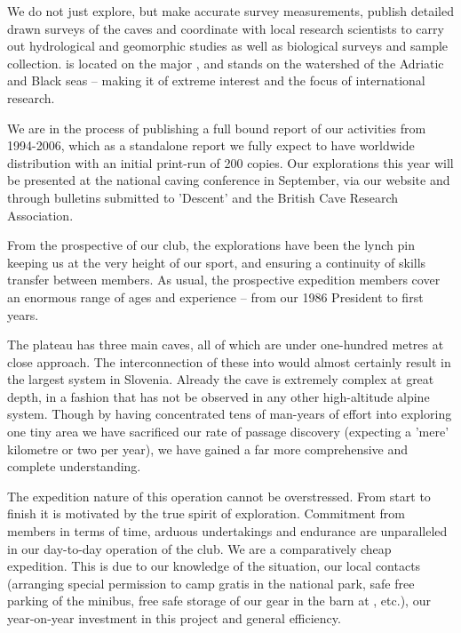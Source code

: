 We do not just explore, but make accurate survey measurements, publish detailed drawn surveys of the caves and coordinate with local research scientists to carry out hydrological and geomorphic studies as well as biological surveys and sample collection.  is located on the major , and stands on the watershed of the Adriatic and Black seas -- making it of extreme interest and the focus of international research.


We are in the process of publishing a full bound report of our activities from 1994-2006, which as a standalone report we fully expect to have worldwide distribution with an initial print-run of 200 copies. Our explorations this year will be presented at the national caving conference in September, via our website and through bulletins submitted to 'Descent' and the British Cave Research Association.


From the prospective of our club, the  explorations have been the lynch pin keeping us at the very height of our sport, and ensuring a continuity of skills transfer between members. As usual, the prospective expedition members cover an enormous range of ages and experience -- from our 1986 President to first years.

The  plateau has three main caves, all of which are under one-hundred metres at close approach. The interconnection of these into  would almost certainly result in the largest system in Slovenia. Already the cave is extremely complex at great depth, in a fashion that has not be observed in any other high-altitude alpine system. Though by having concentrated tens of man-years of effort into exploring one tiny area we have sacrificed our rate of passage discovery (expecting a 'mere' kilometre or two per year), we have gained a far more comprehensive and complete understanding.

The expedition nature of this operation cannot be overstressed. From start to finish it is motivated by the true spirit of exploration. Commitment from members in terms of time, arduous undertakings and endurance are unparalleled in our day-to-day operation of the club. We are a comparatively cheap expedition. This is due to our knowledge of the situation, our local contacts (arranging special permission to camp gratis in the national park, safe free parking of the minibus, free safe storage of our gear in the barn at , etc.), our year-on-year investment in this project and general efficiency.

